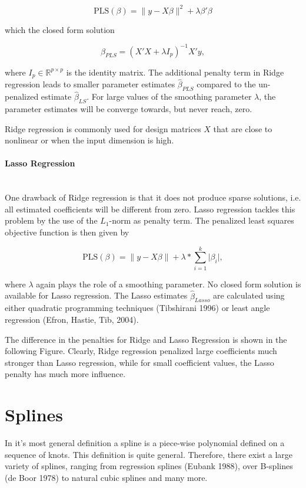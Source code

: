 \documentclass[10pt,a4paper]{article}
\newcommand{\subsubsubsection}[1]{\paragraph{#1}\mbox{}\\}
\begin{document}
$$\text{PLS}(\beta) = \lVert y - X\beta\rVert^2 + \lambda \beta'\beta$$

which the closed form solution 

$$\hat\beta_{PLS} = (X'X + \lambda I_p)^{-1}X'y,$$

where $I_p \in \mathbb R^{p \times p}$ is the identity matrix. The additional penalty term in Ridge regression leads to smaller parameter estimates $\hat \beta_{PLS}$ compared to the un-penalized estimate $\hat \beta_{LS}$. For large values of the smoothing parameter $\lambda$, the parameter estimates will be converge towards, but never reach, zero. 

Ridge regression is commonly used for design matrices $X$ that are close to nonlinear or when the input dimension is high. 

\subsubsubsection{Lasso Regression}

One drawback of Ridge regression is that it does not produce sparse solutions, i.e. all estimated coefficients will be different from zero. Lasso regression tackles this problem by the use of the $L_1$-norm as penalty term. The penalized least squares objective function is then given by

$$\text{PLS}(\beta) = \lVert y - X\beta \rVert + \lambda*\sum_{i=1}^k\vert \beta_i\vert,$$

where $\lambda$ again plays the role of a smoothing parameter. No closed form solution is available for Lasso regression. The Lasso estimates  $\hat \beta_{Lasso}$ are calculated using either quadratic programming techniques (Tibshirani 1996) or least angle regression (Efron, Hastie, Tib, 2004). 

The difference in the penalties for Ridge and Lasso Regression is shown in the following Figure. Clearly, Ridge regression penalized large coefficients much stronger than Lasso regression, while for small coefficient values, the Lasso penalty has much more influence.


\section{Splines} \label{SectionSplines}
	
In it's most general definition a spline is a piece-wise polynomial defined on a sequence of knots. This definition is quite general. Therefore, there exist a large variety of splines, ranging from regression splines (Eubank 1988), over B-splines (de Boor 1978) to natural cubic splines and many more.
\end{document}
